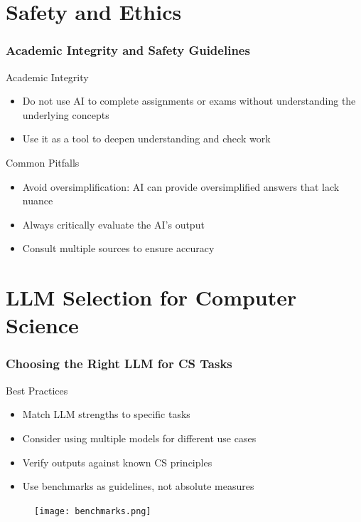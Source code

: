 \documentclass{beamer}
\begin{document}
\section{Safety and Ethics}
\frame{\sectionpage}
\begin{frame}
\frametitle{Academic Integrity and Safety Guidelines}
\begin{block}{Academic Integrity}
\begin{itemize}
\item Do not use AI to complete assignments or exams without understanding the underlying concepts
\item Use it as a tool to deepen understanding and check work
\end{itemize}
\end{block}

\begin{alertblock}{Common Pitfalls}
\begin{itemize}
\item Avoid oversimplification: AI can provide oversimplified answers that lack nuance
\item Always critically evaluate the AI's output
\item Consult multiple sources to ensure accuracy
\end{itemize}
\end{alertblock}
\end{frame}

\section{LLM Selection for Computer Science}
\frame{\sectionpage}

\begin{frame}
\frametitle{Choosing the Right LLM for CS Tasks}

\begin{block}{Best Practices}
\begin{itemize}
\item Match LLM strengths to specific tasks
\item Consider using multiple models for different use cases
\item Verify outputs against known CS principles
\item Use benchmarks as guidelines, not absolute measures
\end{itemize}
\end{block}
\begin{figure}
    \centering
    \texttt{[image: benchmarks.png]}
\end{figure}
\end{frame}
\end{document}
